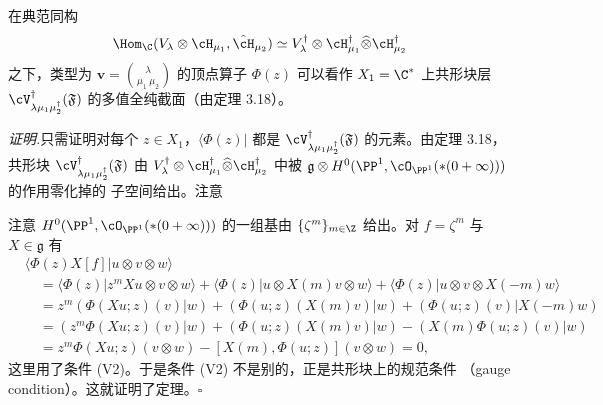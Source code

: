 \begin{theorem}[6.11]
在典范同构
\[
\Hom_\C(V_\lambda\otimes\cH_{\mu_1},\hat{\cH}_{\mu_2})
\simeq V^{\dagger}_\lambda\otimes\cH^{\dagger}_{\mu_1}
\widehat{\otimes}\cH^{\dagger}_{\mu_2}
\]
之下，类型为 $\mathbf{v}=\binom{\lambda}{\mu_1\ \mu_2}$ 的顶点算子 $\Phi(z)$
可以看作 $X_1=\C^*$ 上共形块层
$\cV^{\dagger}_{\lambda\mu_1\mu_2^{\dagger}}(\mathfrak{F})$
的多值全纯截面（由定理 3.18）。
\end{theorem}


\noindent\textit{证明.}\quad 只需证明对每个 $z\in X_1$，$\langle\Phi(z)|$ 都是
$\cV^{\dagger}_{\lambda\mu_1\mu_2^{\dagger}}(\mathfrak{F})$ 的元素。由定理 3.18，
共形块 $\cV^{\dagger}_{\lambda\mu_1\mu_2^{\dagger}}(\mathfrak{F})$ 由
$V^{\dagger}_\lambda\otimes\cH^{\dagger}_{\mu_1}
\widehat{\otimes}\cH^{\dagger}_{\mu_2}$ 中被
$\mathfrak{g}\otimes H^0(\PP^1,\cO_{\PP^1}(*(0+\infty)))$ 的作用零化掉的
子空间给出。注意


注意 $H^0(\PP^1,\cO_{\PP^1}(*(0+\infty)))$ 的一组基由
$\{\zeta^m\}_{m\in\Z}$ 给出。对 $f=\zeta^m$ 与 $X\in\mathfrak{g}$ 有
\[
\begin{aligned}
&\langle\Phi(z)X[f]|u\otimes v\otimes w\rangle\\
&\quad=\langle\Phi(z)|z^mXu\otimes v\otimes w\rangle
 +\langle\Phi(z)|u\otimes X(m)v\otimes w\rangle
 +\langle\Phi(z)|u\otimes v\otimes X(-m)w\rangle\\
&\quad=z^m(\Phi(Xu;z)(v)|w)+(\Phi(u;z)(X(m)v)|w)
 +(\Phi(u;z)(v)|X(-m)w)\\
&\quad=(z^m\Phi(Xu;z)(v)|w)+(\Phi(u;z)(X(m)v)|w)
 -(X(m)\Phi(u;z)(v)|w)\\
&\quad=z^m\Phi(Xu;z)(v\otimes w)-[X(m),\Phi(u;z)](v\otimes w)=0,
\end{aligned}
\]
这里用了条件 (V2)。于是条件 (V2) 不是别的，正是共形块上的规范条件
（gauge condition）。这就证明了定理。\hfill$\square$


